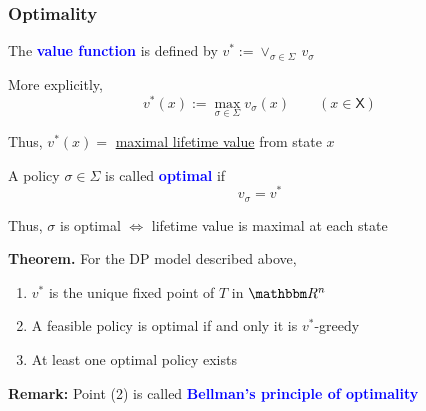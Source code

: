 \documentclass[xcolor=dvipsnames]{beamer}
\newcommand{\navy}[1]{\textcolor{Blue}{\bf #1}}
\newcommand{\RR}{\mathbbm R}
\newcommand{\Xsf}{\mathsf X}
\newcommand{\1}{\mathbbm 1}
\begin{document}
\begin{frame}
    \frametitle{Optimality}

    \vspace{0.5em}
    The \navy{value function} is defined by $v^* := \vee_{\sigma \in \Sigma} \, v_\sigma$

    More explicitly,
    \begin{equation*}
        v^*(x) := \max_{\sigma \in \Sigma} v_\sigma(x)
        \qquad (x \in \Xsf)
    \end{equation*}

    Thus, $v^*(x) = $ \underline{maximal lifetime value} from state $x$

    \vspace{0.5em}
    A policy $\sigma \in \Sigma$ is called \navy{optimal} if
    \begin{equation*}
        v_\sigma = v^*
    \end{equation*}

    Thus, $\sigma$ is optimal $\iff$ lifetime value is maximal at each state  

\end{frame}




\begin{frame}\label{slide:mdp_result}

    \begin{block}{}
        {\bf Theorem.} For the DP model described above,
        \vspace{0.5em}
        \begin{enumerate}
            \item $v^*$ is the unique fixed point of $T$
                in $\RR^n$
            \vspace{0.5em}
            \item A feasible policy is optimal if and only it is
                $v^*$-greedy
            \vspace{0.5em}
            \item At least one optimal policy exists
        \end{enumerate}
    \end{block}

    \vspace{0.5em}
    \vspace{0.5em}

    \textbf{Remark:} Point (2) is called \navy{Bellman's principle of optimality}


\end{frame}
\end{document}
